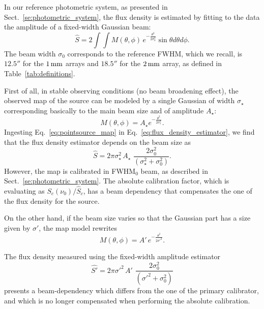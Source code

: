 In our reference photometric system, as presented in
Sect.~\ref{se:photometric_system}, 
the flux density is estimated by fitting to the data the amplitude of a fixed-width
Gaussian beam:
\begin{equation}
  \hat{S}  = 2 \int \int M(\theta, \phi)\, e^{-\frac{\theta^{2}}{2\sigma_{0}^{2}}} \sin \theta d\theta d\phi.
  \label{eq:flux_density_estimator}
\end{equation}
The beam width $\sigma_{0}$ corresponds to the
reference FWHM, which we recall, is $12.5''$ for the $1\,\rm{mm}$ arrays and $18.5''$ for
the $2\,\rm{mm}$ array, as defined in Table~\ref{tab:definitions}.

First of all, in stable observing conditions (no beam
broadening effect), the observed map of the source can be modeled by a single Gaussian of
width $\sigma_\star$ corresponding basically to the main beam size and
of amplitude $A_\star$:
\begin{equation}
  M(\theta, \phi) = A_\star e^{-\frac{\theta^{2}}{2\sigma_\star^{2}}}.
  \label{eq:pointsource_map}
\end{equation}
Ingesting Eq.~\ref{eq:pointsource_map} in
Eq.~\ref{eq:flux_density_estimator}, we find that the flux density
estimator depends on the beam size as
\begin{equation}
  \hat{S}  = 2\pi \sigma_{\star}^2 \, A_{\star} \, \,  \frac{2 \sigma_0^2}{(\sigma_{\star}^2 + \sigma_0^2)}.
\end{equation}
However, the map is calibrated in FWHM$_0$ beam, as described in
Sect.~\ref{se:photometric_system}. The absolute calibration factor,
which is evaluating as
$S_{c}(\nu_{0})/\hat{S}_{c}$, has a beam dependency that
compensates the one of the flux density for the source.

On the other hand, if the beam size varies so that the Gaussian part has a size given by
$\sigma'$, the map model rewrites  
\begin{equation}
  M(\theta, \phi) = A'\, e^{-\frac{\theta^{2}}{2\sigma'^{2}}}.
  \label{eq:broader_beam_map}
\end{equation}

The flux density measured using the fixed-width amplitude estimator 
\begin{equation}
  \hat{S'}  =2\pi \sigma'^2 \, A' \, \,  \frac{2 \sigma_0^2}{(\sigma'^2 + \sigma_0^2)}
\end{equation}
presents a beam-dependency which differs from the one of the primary
calibrator, and which is no longer compensated when performing the
absolute calibration.

